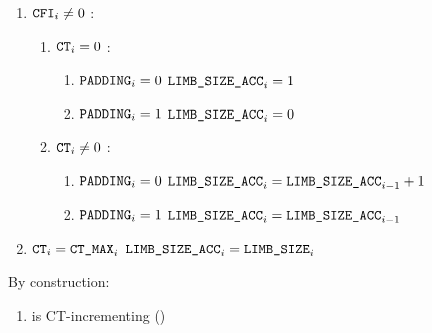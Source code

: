 \begin{enumerate}
	\item \If $\texttt{CFI} _{i} \neq 0$ \Then:
		\begin{enumerate}
			\item \If $\texttt{CT} _{i} = 0$ \Then:
				\begin{enumerate}
					\item \If $\texttt{PADDING} _{i} = 0$ \Then $\texttt{LIMB\_SIZE\_ACC} _{i} = 1$
					\item \If $\texttt{PADDING} _{i} = 1$ \Then $\texttt{LIMB\_SIZE\_ACC} _{i} = 0$
				\end{enumerate}
			\item \If $\texttt{CT} _{i} \neq 0$ \Then:
				\begin{enumerate}
					\item \If $\texttt{PADDING} _{i} = 0$ \Then $\texttt{LIMB\_SIZE\_ACC} _{i} = \texttt{LIMB\_SIZE\_ACC} _{i-1}+1$
					\item \If $\texttt{PADDING} _{i} = 1$ \Then $\texttt{LIMB\_SIZE\_ACC} _{i} = \texttt{LIMB\_SIZE\_ACC} _{i-1}$
				\end{enumerate}
		\end{enumerate}
	\item \If $\texttt{CT} _{i} = \texttt{CT\_MAX} _{i}$ \Then $\texttt{LIMB\_SIZE\_ACC} _{i} = \texttt{LIMB\_SIZE} _{i}$
\end{enumerate}
\saNote{} By construction:
\begin{enumerate}[resume]
	\item \romColumnLimbByteSizeAcc{} is CT-incrementing \quad (\trash)
\end{enumerate}
